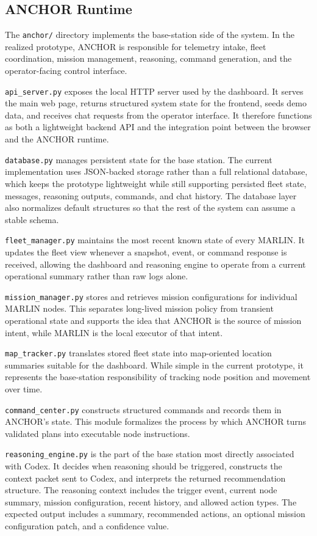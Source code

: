 \documentclass[journal]{IEEEtran}
\begin{document}
\subsection{ANCHOR Runtime}
The \texttt{anchor/} directory implements the base-station side of the system. In the realized prototype, ANCHOR is responsible for telemetry intake, fleet coordination, mission management, reasoning, command generation, and the operator-facing control interface.

\texttt{api\_server.py} exposes the local HTTP server used by the dashboard. It serves the main web page, returns structured system state for the frontend, seeds demo data, and receives chat requests from the operator interface. It therefore functions as both a lightweight backend API and the integration point between the browser and the ANCHOR runtime.

\texttt{database.py} manages persistent state for the base station. The current implementation uses JSON-backed storage rather than a full relational database, which keeps the prototype lightweight while still supporting persisted fleet state, messages, reasoning outputs, commands, and chat history. The database layer also normalizes default structures so that the rest of the system can assume a stable schema.

\texttt{fleet\_manager.py} maintains the most recent known state of every MARLIN. It updates the fleet view whenever a snapshot, event, or command response is received, allowing the dashboard and reasoning engine to operate from a current operational summary rather than raw logs alone.

\texttt{mission\_manager.py} stores and retrieves mission configurations for individual MARLIN nodes. This separates long-lived mission policy from transient operational state and supports the idea that ANCHOR is the source of mission intent, while MARLIN is the local executor of that intent.

\texttt{map\_tracker.py} translates stored fleet state into map-oriented location summaries suitable for the dashboard. While simple in the current prototype, it represents the base-station responsibility of tracking node position and movement over time.

\texttt{command\_center.py} constructs structured commands and records them in ANCHOR's state. This module formalizes the process by which ANCHOR turns validated plans into executable node instructions.

\texttt{reasoning\_engine.py} is the part of the base station most directly associated with Codex. It decides when reasoning should be triggered, constructs the context packet sent to Codex, and interprets the returned recommendation structure. The reasoning context includes the trigger event, current node summary, mission configuration, recent history, and allowed action types. The expected output includes a summary, recommended actions, an optional mission configuration patch, and a confidence value.
\end{document}
